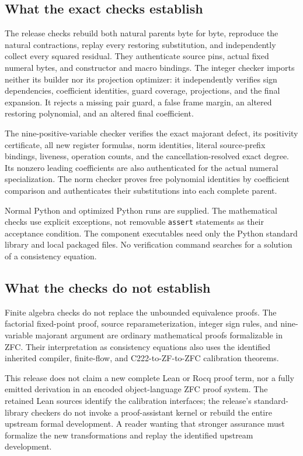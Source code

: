 \documentclass[11pt,letterpaper]{article}
\theoremstyle{definition}
\theoremstyle{remark}
\begin{document}
\subsection{What the exact checks establish}

The release checks rebuild both natural parents byte for byte, reproduce
the natural contractions, replay every restoring substitution, and
independently collect every squared residual. They authenticate source
pins, actual fixed numeral bytes, and constructor and macro bindings.
The integer checker imports neither its builder nor its projection
optimizer: it independently verifies sign dependencies, coefficient
identities, guard coverage, projections, and the final expansion.
It rejects a missing pair guard, a false frame margin, an altered
restoring polynomial, and an altered final coefficient.

The nine-positive-variable checker verifies the exact majorant defect,
its positivity certificate, all new register formulas, norm identities,
literal source-prefix bindings, liveness, operation counts, and the
cancellation-resolved exact degree. Its nonzero leading coefficients
are also authenticated for the actual numeral specialization.
The norm checker proves free polynomial identities by coefficient
comparison and authenticates their substitutions into each complete
parent.

Normal Python and optimized Python runs are supplied. The mathematical
checks use explicit exceptions, not removable \texttt{assert}
statements as their acceptance condition. The component executables
need only the Python standard library and local packaged files.
No verification command searches for a solution of a consistency
equation.

\subsection{What the checks do not establish}

Finite algebra checks do not replace the unbounded equivalence proofs.
The factorial fixed-point proof, source reparameterization, integer
sign rules, and nine-variable majorant argument are ordinary
mathematical proofs formalizable in ZFC. Their interpretation as
consistency equations also uses the identified inherited compiler,
finite-flow, and C222-to-ZF-to-ZFC calibration theorems.

This release does not claim a new complete Lean or Rocq proof term,
nor a fully emitted derivation in an encoded object-language ZFC proof
system. The retained Lean sources identify the calibration interfaces;
the release's standard-library checkers do not invoke a proof-assistant
kernel or rebuild the entire upstream formal development. A reader
wanting that stronger assurance must formalize the new transformations
and replay the identified upstream development.
\end{document}
